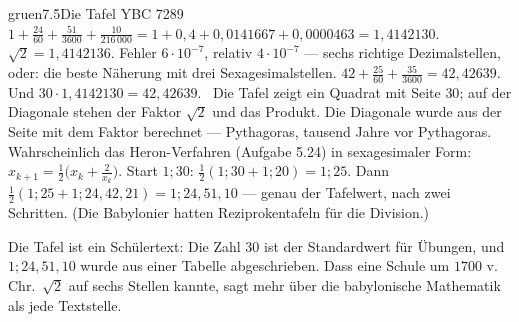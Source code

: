 \begin{loesungkarte}{gruen}{7.5}{Die Tafel YBC 7289}
$1 + \frac{24}{60} + \frac{51}{3600} + \frac{10}{216\,000} = 1 + 0{,}4 + 0{,}0141667 + 0{,}0000463 = 1{,}4142130$. $\sqrt2 = 1{,}4142136$. Fehler $6\cdot10^{-7}$, relativ $4\cdot10^{-7}$ --- sechs richtige Dezimalstellen, oder: die beste Näherung mit drei Sexagesimalstellen.
$42 + \frac{25}{60} + \frac{35}{3600} = 42{,}42639$. Und $30\cdot1{,}4142130 = 42{,}42639$. \checkmark\ Die Tafel zeigt ein Quadrat mit Seite $30$; auf der Diagonale stehen der Faktor $\sqrt2$ und das Produkt. Die Diagonale wurde aus der Seite mit dem Faktor berechnet --- Pythagoras, tausend Jahre vor Pythagoras.
Wahrscheinlich das Heron-Verfahren (Aufgabe 5.24) in sexagesimaler Form: $x_{k+1} = \frac12\bigl(x_k + \frac2{x_k}\bigr)$. Start $1;30$: $\frac12(1;30 + 1;20) = 1;25$. Dann $\frac12(1;25 + 1;24,42,21) = 1;24,51,10$ --- genau der Tafelwert, nach zwei Schritten. (Die Babylonier hatten Reziprokentafeln für die Division.)
\begin{mitnehmen}\kastentext
Die Tafel ist ein Schülertext: Die Zahl $30$ ist der Standardwert für Übungen, und $1;24,51,10$ wurde aus einer Tabelle abgeschrieben. Dass eine Schule um $1700$ v.\,Chr.\ $\sqrt2$ auf sechs Stellen kannte, sagt mehr über die babylonische Mathematik als jede Textstelle.
\end{mitnehmen}
\end{loesungkarte}

